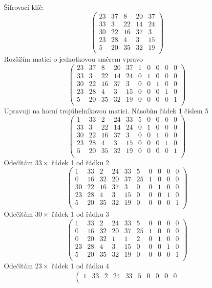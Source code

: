 \documentclass[a4paper,12pt]{report}
\begin{document}
\begin{itemize}
Šifrovací klíč:
$$\left(\begin{array}{ccccc}
23&37&8&20&37\\
33&3&22&14&24\\
30&22&16&37&3\\
23&28&4&3&15\\
5&20&35&32&19\\
\end{array}\right)$$
Rozšířím matici o jednotkovou směrem vpravo
$$\left(\begin{array}{cccccccccc}
23&37&8&20&37&1&0&0&0&0\\
33&3&22&14&24&0&1&0&0&0\\
30&22&16&37&3&0&0&1&0&0\\
23&28&4&3&15&0&0&0&1&0\\
5&20&35&32&19&0&0&0&0&1\\
\end{array}\right)$$
Upravuji na horní trojúhelníkovou matici.
Násobím řádek 1 číslem 5
$$\left(\begin{array}{cccccccccc}
1&33&2&24&33&5&0&0&0&0\\
33&3&22&14&24&0&1&0&0&0\\
30&22&16&37&3&0&0&1&0&0\\
23&28&4&3&15&0&0&0&1&0\\
5&20&35&32&19&0&0&0&0&1\\
\end{array}\right)$$
Odečítám \(33\times\) řádek 1 od řádku 2
$$\left(\begin{array}{cccccccccc}
1&33&2&24&33&5&0&0&0&0\\
0&16&32&20&37&25&1&0&0&0\\
30&22&16&37&3&0&0&1&0&0\\
23&28&4&3&15&0&0&0&1&0\\
5&20&35&32&19&0&0&0&0&1\\
\end{array}\right)$$
Odečítám \(30\times\) řádek 1 od řádku 3
$$\left(\begin{array}{cccccccccc}
1&33&2&24&33&5&0&0&0&0\\
0&16&32&20&37&25&1&0&0&0\\
0&20&32&1&1&2&0&1&0&0\\
23&28&4&3&15&0&0&0&1&0\\
5&20&35&32&19&0&0&0&0&1\\
\end{array}\right)$$
Odečítám \(23\times\) řádek 1 od řádku 4
$$\left(\begin{array}{cccccccccc}
1&33&2&24&33&5&0&0&0&0\\

\end{array}$$
\end{itemize}
\end{document}
